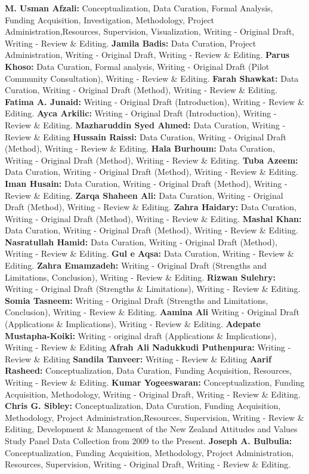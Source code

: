 \documentclass[
]{interact}
\begin{document}
\textbf{M. Usman Afzali:} Conceptualization, Data Curation, Formal
Analysis, Funding Acquisition, Investigation, Methodology, Project
Administration,Resources, Supervision, Visualization, Writing - Original
Draft, Writing - Review \& Editing. \textbf{Jamila Badis:} Data
Curation, Project Administration, Writing - Original Draft, Writing -
Review \& Editing. \textbf{Parus Khoso:} Data Curation, Formal analysis,
Writing - Original Draft (Pilot Community Consultation), Writing -
Review \& Editing. \textbf{Farah Shawkat:} Data Curation, Writing -
Original Draft (Method), Writing - Review \& Editing. \textbf{Fatima A.
Junaid:} Writing - Original Draft (Introduction), Writing - Review \&
Editing. \textbf{Ayca Arkilic:} Writing - Original Draft (Introduction),
Writing - Review \& Editing. \textbf{Mazharuddin Syed Ahmed:} Data
Curation, Writing - Review \& Editing \textbf{Hussain Raissi:} Data
Curation, Writing - Original Draft (Method), Writing - Review \&
Editing. \textbf{Hala Burhoum:} Data Curation, Writing - Original Draft
(Method), Writing - Review \& Editing. \textbf{Tuba Azeem:} Data
Curation, Writing - Original Draft (Method), Writing - Review \&
Editing. \textbf{Iman Husain:} Data Curation, Writing - Original Draft
(Method), Writing - Review \& Editing. \textbf{Zarqa Shaheen Ali:} Data
Curation, Writing - Original Draft (Method), Writing - Review \&
Editing. \textbf{Zahra Haidary:} Data Curation, Writing - Original Draft
(Method), Writing - Review \& Editing. \textbf{Mashal Khan:} Data
Curation, Writing - Original Draft (Method), Writing - Review \&
Editing. \textbf{Nasratullah Hamid:} Data Curation, Writing - Original
Draft (Method), Writing - Review \& Editing. \textbf{Gul e Aqsa:} Data
Curation, Writing - Review \& Editing. \textbf{Zahra Emamzadeh:} Writing
- Original Draft (Strengths and Limitations, Conclusion), Writing -
Review \& Editing. \textbf{Rizwan Sulehry:} Writing - Original Draft
(Strengths \& Limitations), Writing - Review \& Editing. \textbf{Somia
Tasneem:} Writing - Original Draft (Strengths and Limitations,
Conclusion), Writing - Review \& Editing. \textbf{Aamina Ali} Writing -
Original Draft (Applications \& Implications), Writing - Review \&
Editing. \textbf{Adepate Mustapha-Koiki:} Writing - original draft
(Applications \& Implications), Writing - Review \& Editing
\textbf{Afrah Ali Nadukkudi Puthenpura:} Writing - Review \& Editing
\textbf{Sandila Tanveer:} Writing - Review \& Editing \textbf{Aarif
Rasheed:} Conceptualization, Data Curation, Funding Acquisition,
Resources, Writing - Review \& Editing. \textbf{Kumar Yogeeswaran:}
Conceptualization, Funding Acquisition, Methodology, Writing - Original
Draft, Writing - Review \& Editing. \textbf{Chris G. Sibley:}
Conceptualization, Data Curation, Funding Acquisition, Methodology,
Project Administration,Resources, Supervision, Writing - Review \&
Editing, Development \& Management of the New Zealand Attitudes and
Values Study Panel Data Collection from 2009 to the Present.
\textbf{Joseph A. Bulbulia:} Conceptualization, Funding Acquisition,
Methodology, Project Administration, Resources, Supervision, Writing -
Original Draft, Writing - Review \& Editing.
\end{document}
